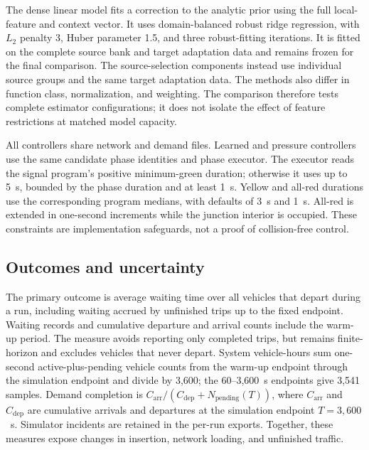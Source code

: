 The dense linear model fits a correction to the analytic prior using the full local-feature and context vector. It uses domain-balanced robust ridge regression, with $L_2$ penalty 3, Huber parameter 1.5, and three robust-fitting iterations. It is fitted on the complete source bank and target adaptation data and remains frozen for the final comparison. The source-selection components instead use individual source groups and the same target adaptation data. The methods also differ in function class, normalization, and weighting. The comparison therefore tests complete estimator configurations; it does not isolate the effect of feature restrictions at matched model capacity.

All controllers share network and demand files. Learned and pressure controllers use the same candidate phase identities and phase executor. The executor reads the signal program's positive minimum-green duration; otherwise it uses up to 5~s, bounded by the phase duration and at least 1~s. Yellow and all-red durations use the corresponding program medians, with defaults of 3~s and 1~s. All-red is extended in one-second increments while the junction interior is occupied. These constraints are implementation safeguards, not a proof of collision-free control.

\subsection{Outcomes and uncertainty}
The primary outcome is average waiting time over all vehicles that depart during a run, including waiting accrued by unfinished trips up to the fixed endpoint. Waiting records and cumulative departure and arrival counts include the warm-up period. The measure avoids reporting only completed trips, but remains finite-horizon and excludes vehicles that never depart. System vehicle-hours sum one-second active-plus-pending vehicle counts from the warm-up endpoint through the simulation endpoint and divide by 3,600; the 60--3,600~s endpoints give 3,541 samples. Demand completion is $C_{\mathrm{arr}}/(C_{\mathrm{dep}}+N_{\mathrm{pending}}(T))$, where $C_{\mathrm{arr}}$ and $C_{\mathrm{dep}}$ are cumulative arrivals and departures at the simulation endpoint $T=3{,}600$~s. Simulator incidents are retained in the per-run exports. Together, these measures expose changes in insertion, network loading, and unfinished traffic.


